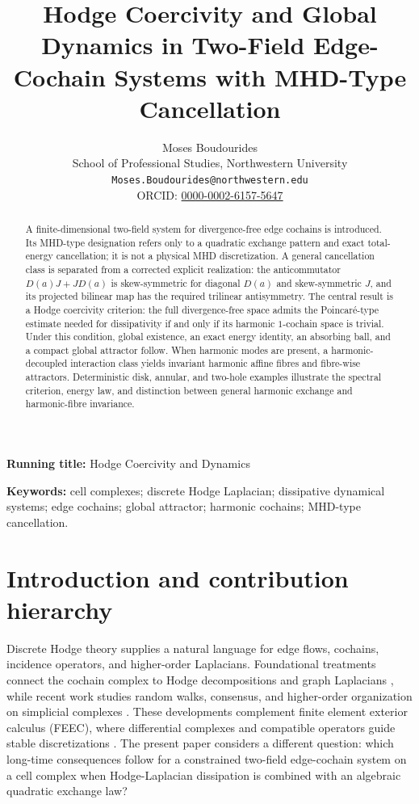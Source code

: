 \documentclass[11pt]{article}
\title{Hodge Coercivity and Global Dynamics in Two-Field Edge-Cochain Systems with MHD-Type Cancellation}
\author{Moses Boudourides\\
School of Professional Studies, Northwestern University\\
\texttt{Moses.Boudourides@northwestern.edu}\\
ORCID: \href{https://orcid.org/0000-0002-6157-5647}{0000-0002-6157-5647}}
\date{}
\theoremstyle{remark}
\begin{document}
\maketitle

\noindent\textbf{Running title:} Hodge Coercivity and Dynamics

\begin{abstract}
A finite-dimensional two-field system for divergence-free edge cochains is introduced. Its MHD-type designation refers only to a quadratic exchange pattern and exact total-energy cancellation; it is not a physical MHD discretization. A general cancellation class is separated from a corrected explicit realization: the anticommutator $D(a)J+JD(a)$ is skew-symmetric for diagonal $D(a)$ and skew-symmetric $J$, and its projected bilinear map has the required trilinear antisymmetry. The central result is a Hodge coercivity criterion: the full divergence-free space admits the Poincar\'e-type estimate needed for dissipativity if and only if its harmonic $1$-cochain space is trivial. Under this condition, global existence, an exact energy identity, an absorbing ball, and a compact global attractor follow. When harmonic modes are present, a harmonic-decoupled interaction class yields invariant harmonic affine fibres and fibre-wise attractors. Deterministic disk, annular, and two-hole examples illustrate the spectral criterion, energy law, and distinction between general harmonic exchange and harmonic-fibre invariance.
\end{abstract}

\noindent\textbf{Keywords:} cell complexes; discrete Hodge Laplacian; dissipative dynamical systems; edge cochains; global attractor; harmonic cochains; MHD-type cancellation.

\section{Introduction and contribution hierarchy}

Discrete Hodge theory supplies a natural language for edge flows, cochains, incidence operators, and higher-order Laplacians. Foundational treatments connect the cochain complex to Hodge decompositions and graph Laplacians \cite{Lim2020,HorakJost2013}, while recent work studies random walks, consensus, and higher-order organization on simplicial complexes \cite{SchaubEtAl2020,ZieglerEtAl2022,BensonGleichLeskovec2016,BattistonEtAl2021}. These developments complement finite element exterior calculus (FEEC), where differential complexes and compatible operators guide stable discretizations \cite{ArnoldFalkWinther2006,ArnoldFalkWinther2010}. The present paper considers a different question: which long-time consequences follow for a constrained two-field edge-cochain system on a cell complex when Hodge-Laplacian dissipation is combined with an algebraic quadratic exchange law?
\end{document}
